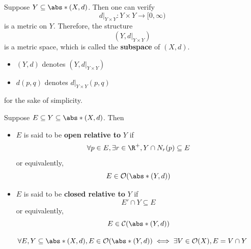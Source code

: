\begin{remark}
  Suppose $Y \subseteq \abs*{(X, d)}$. Then one can verify
  \[
    d|_{Y \times Y}: Y \times Y \to [0, \infty)
  \]
  is a metric on $Y$. Therefore, the structure
  \[
    (Y, d|_{Y \times Y})
  \]
  is a metric space, which is called the \textbf{subspace} of $(X, d)$.
  \begin{itemize}
    \item $(Y, d)$ denotes $(Y, d|_{Y \times Y})$
    \item $d(p, q)$ denotes $d|_{Y \times Y}(p, q)$
  \end{itemize}
  for the sake of simplicity.
\end{remark}

\begin{definition} \label{an1:def:relative-open-closed-sets}
  Suppose $E \subseteq Y \subseteq \abs*{(X, d)}$. Then
  \begin{itemize}
    \item $E$ is said to be \textbf{open relative to} $Y$ if
          \[
            \forall p \in E, \exists r \in \R^{+}, Y \cap N_{r}(p) \subseteq E
          \]
          or equivalently,
          \[
            E \in \mathcal{O}(\abs*{(Y, d)})
          \]
    \item $E$ is said to be \textbf{closed relative to} $Y$ if
          \[
            E' \cap Y \subseteq E
          \]
          or equivalently,
          \[
            E \in \mathcal{C}(\abs*{(Y, d)})
          \]
  \end{itemize}
\end{definition}

\begin{theorem} \label{an1:thm:open-set-relative-to-subspace}
  \[
    \forall E, Y \subseteq \abs*{(X, d)}, E \in \mathcal{O}(\abs*{(Y, d)})
    \iff \exists V \in \mathcal{O}(X), E = V \cap Y
  \]
\end{theorem}

